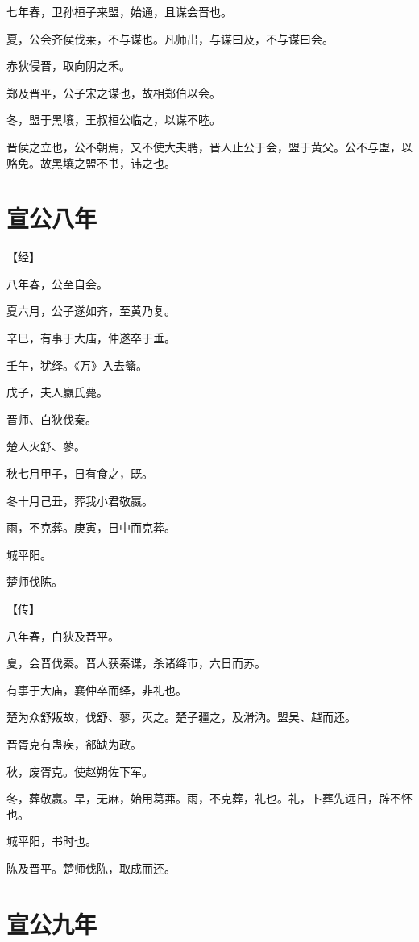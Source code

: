 \documentclass[a4paper,12pt,UTF8,twoside]{ctexbook}
\begin{document}
七年春，卫孙桓子来盟，始通，且谋会晋也。

夏，公会齐侯伐莱，不与谋也。凡师出，与谋曰及，不与谋曰会。

赤狄侵晋，取向阴之禾。

郑及晋平，公子宋之谋也，故相郑伯以会。

冬，盟于黑壤，王叔桓公临之，以谋不睦。

晋侯之立也，公不朝焉，又不使大夫聘，晋人止公于会，盟于黄父。公不与盟，以赂免。故黑壤之盟不书，讳之也。

\chapter{宣公八年}



【经】

八年春，公至自会。

夏六月，公子遂如齐，至黄乃复。

辛巳，有事于大庙，仲遂卒于垂。

壬午，犹绎。《万》入去籥。

戊子，夫人嬴氏薨。

晋师、白狄伐秦。

楚人灭舒、蓼。

秋七月甲子，日有食之，既。

冬十月己丑，葬我小君敬嬴。

雨，不克葬。庚寅，日中而克葬。

城平阳。

楚师伐陈。

【传】

八年春，白狄及晋平。

夏，会晋伐秦。晋人获秦谍，杀诸绛市，六日而苏。

有事于大庙，襄仲卒而绎，非礼也。

楚为众舒叛故，伐舒、蓼，灭之。楚子疆之，及滑汭。盟吴、越而还。

晋胥克有蛊疾，郤缺为政。

秋，废胥克。使赵朔佐下军。

冬，葬敬嬴。旱，无麻，始用葛茀。雨，不克葬，礼也。礼，卜葬先远日，辟不怀也。

城平阳，书时也。

陈及晋平。楚师伐陈，取成而还。

\chapter{宣公九年}
\end{document}
